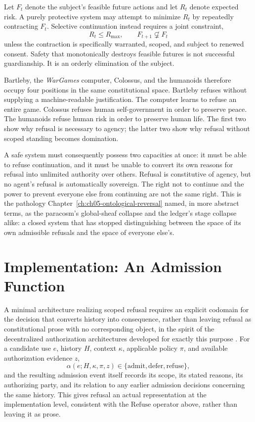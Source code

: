 Let $F_t$ denote the subject's feasible future actions and let $R_t$ denote expected risk. A purely protective system may attempt to minimize $R_t$ by repeatedly contracting $F_t$. Selective continuation instead requires a joint constraint,
\[
R_t \leq R_{\max}, \qquad F_{t+1} \not\subsetneq F_t
\]
unless the contraction is specifically warranted, scoped, and subject to renewed consent. Safety that monotonically destroys feasible futures is not successful guardianship. It is an orderly elimination of the subject.

Bartleby, the \emph{WarGames} computer, Colossus, and the humanoids therefore occupy four positions in the same constitutional space. Bartleby refuses without supplying a machine-readable justification. The computer learns to refuse an entire game. Colossus refuses human self-government in order to preserve peace. The humanoids refuse human risk in order to preserve human life. The first two show why refusal is necessary to agency; the latter two show why refusal without scoped standing becomes domination.

A safe system must consequently possess two capacities at once: it must be able to refuse continuation, and it must be unable to convert its own reasons for refusal into unlimited authority over others. Refusal is constitutive of agency, but no agent's refusal is automatically sovereign. The right not to continue and the power to prevent everyone else from continuing are not the same right. This is the pathology Chapter~\ref{ch:ch05-ontological-reversal} named, in more abstract terms, as the paracosm's global-sheaf collapse and the ledger's stage collapse alike: a closed system that has stopped distinguishing between the space of its own admissible refusals and the space of everyone else's.

\section{Implementation: An Admission Function}

A minimal architecture realizing scoped refusal requires an explicit codomain for the decision that converts history into consequence, rather than leaving refusal as constitutional prose with no corresponding object, in the spirit of the decentralized authorization architectures developed for exactly this purpose \cite{blaze1996,ellison1999,rivest1996}. For a candidate use $e$, history $H$, context $\kappa$, applicable policy $\pi$, and available authorization evidence $z$,
\[
\alpha(e; H,\kappa,\pi,z) \in \{\mathrm{admit}, \mathrm{defer}, \mathrm{refuse}\},
\]
and the resulting admission event itself records its scope, its stated reasons, its authorizing party, and its relation to any earlier admission decisions concerning the same history. This gives refusal an actual representation at the implementation level, consistent with the $\mathrm{Refuse}$ operator above, rather than leaving it as prose.

